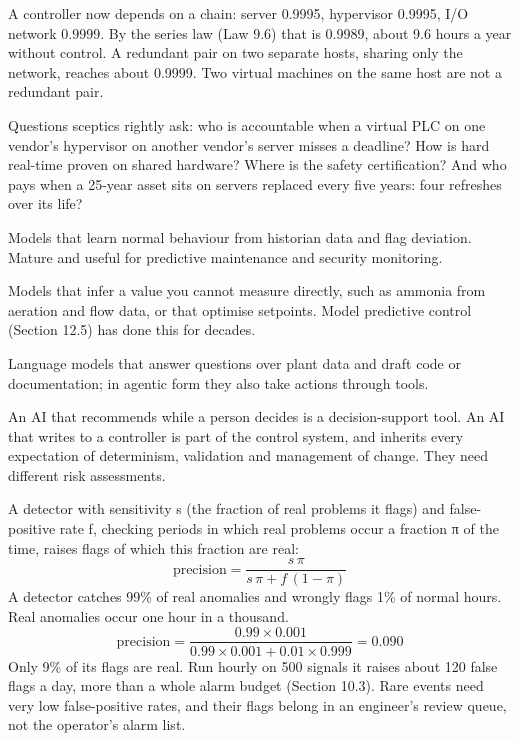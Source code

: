  A controller now depends on a chain: server 0.9995, hypervisor 0.9995, I/O network 0.9999. By the series law (Law 9.6) that is 0.9989, about 9.6 hours a year without control. A redundant pair on two separate hosts, sharing only the network, reaches about 0.9999. Two virtual machines on the same host are not a redundant pair.

Questions sceptics rightly ask: who is accountable when a virtual PLC on one vendor's hypervisor on another vendor's server misses a deadline? How is hard real-time proven on shared hardware? Where is the safety certification? And who pays when a 25-year asset sits on servers replaced every five years: four refreshes over its life?

 Models that learn normal behaviour from historian data and flag deviation. Mature and useful for predictive maintenance and security monitoring.

 Models that infer a value you cannot measure directly, such as ammonia from aeration and flow data, or that optimise setpoints. Model predictive control (Section 12.5) has done this for decades.

 Language models that answer questions over plant data and draft code or documentation; in agentic form they also take actions through tools.

 An AI that recommends while a person decides is a decision-support tool. An AI that writes to a controller is part of the control system, and inherits every expectation of determinism, validation and management of change. They need different risk assessments.

 A detector with sensitivity s (the fraction of real problems it flags) and false-positive rate f, checking periods in which real problems occur a fraction π of the time, raises flags of which this fraction are real:
\[ \text{precision} = \frac{s\,\pi}{s\,\pi + f\,(1-\pi)} \]
 A detector catches 99\% of real anomalies and wrongly flags 1\% of normal hours. Real anomalies occur one hour in a thousand.
\[ \text{precision} = \frac{0.99 \times 0.001}{0.99 \times 0.001 + 0.01 \times 0.999} = 0.090 \]
Only 9\% of its flags are real. Run hourly on 500 signals it raises about 120 false flags a day, more than a whole alarm budget (Section 10.3). Rare events need very low false-positive rates, and their flags belong in an engineer's review queue, not the operator's alarm list.


